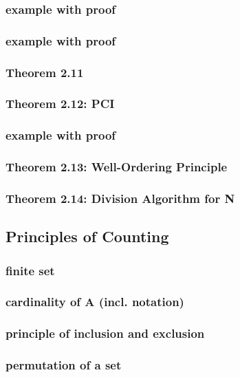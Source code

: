 \documentclass[a4paper]{article}
\begin{document}
\subsubsection*{example with proof}
\subsubsection*{example with proof}
\subsubsection*{Theorem 2.11}
\subsubsection*{Theorem 2.12: PCI}
\subsubsection*{example with proof}
\subsubsection*{Theorem 2.13: Well-Ordering Principle}
\subsubsection*{Theorem 2.14: Division Algorithm for N}

\newpage
\subsection{Principles of Counting}   %
\subsubsection*{finite set}
\subsubsection*{cardinality of A (incl. notation)}
\subsubsection*{principle of inclusion and exclusion}
\subsubsection*{permutation of a set}
\end{document}
